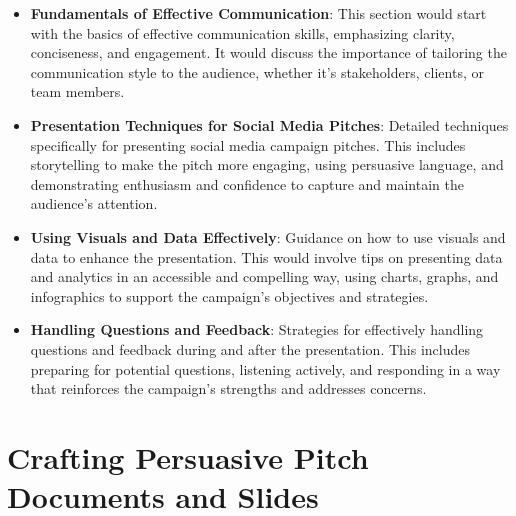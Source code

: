 \documentclass[
]{book}
\providecommand{\tightlist}{%
  \setlength{\itemsep}{0pt}\setlength{\parskip}{0pt}}
\begin{document}
\begin{itemize}
\tightlist
\item
  \textbf{Fundamentals of Effective Communication}: This section would start with the basics of effective communication skills, emphasizing clarity, conciseness, and engagement. It would discuss the importance of tailoring the communication style to the audience, whether it's stakeholders, clients, or team members.
\item
  \textbf{Presentation Techniques for Social Media Pitches}: Detailed techniques specifically for presenting social media campaign pitches. This includes storytelling to make the pitch more engaging, using persuasive language, and demonstrating enthusiasm and confidence to capture and maintain the audience's attention.
\item
  \textbf{Using Visuals and Data Effectively}: Guidance on how to use visuals and data to enhance the presentation. This would involve tips on presenting data and analytics in an accessible and compelling way, using charts, graphs, and infographics to support the campaign's objectives and strategies.
\item
  \textbf{Handling Questions and Feedback}: Strategies for effectively handling questions and feedback during and after the presentation. This includes preparing for potential questions, listening actively, and responding in a way that reinforces the campaign's strengths and addresses concerns.
\end{itemize}

\hypertarget{crafting-persuasive-pitch-documents-and-slides}{%
\section*{Crafting Persuasive Pitch Documents and Slides}\label{crafting-persuasive-pitch-documents-and-slides}}
\end{document}
